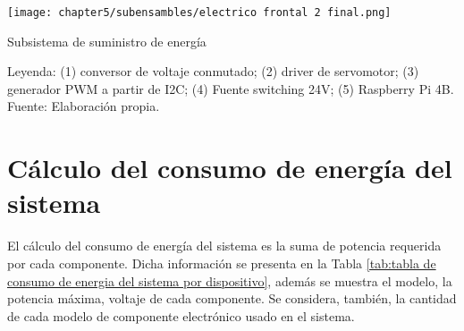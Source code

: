 \begin{myfigure}[H]
	\footnotesize\centering
	\texttt{[image: chapter5/subensambles/electrico frontal 2 final.png]}
	\caption{Subsistema de suministro de energía}
	\begin{myflushcenter}
		 Leyenda: (1) conversor de voltaje conmutado; (2) driver de servomotor; (3) generador PWM a partir de I2C; (4) Fuente switching 24V; (5) Raspberry Pi 4B.\\
		Fuente: Elaboración propia.
	\end{myflushcenter}
	\label{fig:subsistema de suministro de energia}
\end{myfigure}

\vspace{-2.0em}

\section{Cálculo del consumo de energía del sistema} 

El cálculo del consumo de energía del sistema es la suma de potencia requerida por cada componente. Dicha información se presenta en la Tabla \ref{tab:tabla de consumo de energia del sistema por dispositivo}, además se muestra el modelo, la potencia máxima, voltaje de cada componente. Se considera, también, la cantidad de cada modelo de componente electrónico usado en el sistema.


